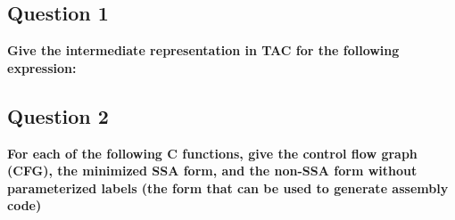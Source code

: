 \subsection{Question 1}
    \textbf{Give the intermediate representation in TAC for the following expression:}

    

    

\subsection{Question 2}
    \textbf{For each of the following C functions, give the control flow graph (CFG), the minimized SSA form, and the non-SSA form without parameterized labels (the form that can be used to generate assembly code)}

